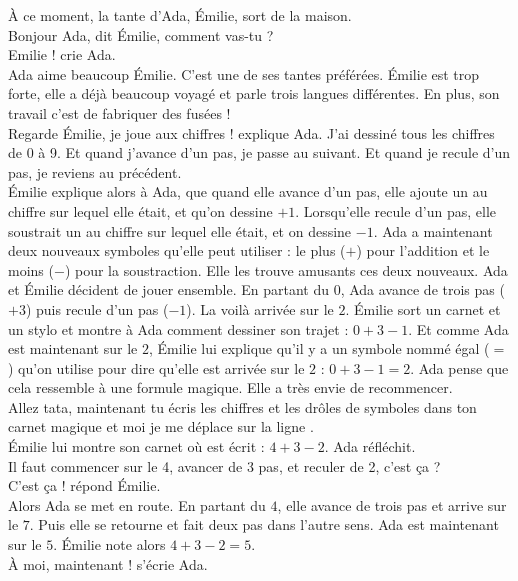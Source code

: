 À ce moment, la tante d'Ada, Émilie, sort de la maison. \\
\guillemotleft Bonjour Ada, dit Émilie, comment vas-tu ?\\
\mdash Emilie !  crie Ada. \guillemotright \\
Ada aime beaucoup Émilie. C’est une de ses tantes préférées. Émilie est trop forte, elle a déjà beaucoup voyagé et parle trois langues différentes. En plus, son travail c’est de fabriquer des fusées !\\
\guillemotleft Regarde Émilie, je joue aux chiffres ! explique Ada. J’ai dessiné tous les chiffres de 0 à 9. Et quand j’avance d’un pas, je passe au suivant. Et quand je recule d’un pas, je reviens au précédent. \guillemotright \\
Émilie explique alors à Ada, que quand elle avance d’un pas, elle ajoute un au chiffre sur lequel elle était, et qu'on dessine $+1$. Lorsqu’elle recule d’un pas, elle soustrait un au chiffre sur lequel elle était, et on dessine $-1$. Ada a maintenant deux nouveaux symboles qu’elle peut utiliser : le plus ($+$) pour l’addition et le moins ($-$) pour la soustraction. Elle les trouve amusants ces deux nouveaux. 
Ada et Émilie décident de jouer ensemble. En partant du $0$, Ada avance de trois pas ($+3$) puis recule d'un pas ($-1$). La voilà arrivée sur le $2$. Émilie sort un carnet et un stylo et montre à Ada comment dessiner son trajet : $0 + 3 - 1 $. Et comme Ada est maintenant sur le $2$, Émilie lui explique qu’il y a un symbole nommé égal ($=$) qu'on utilise pour dire qu’elle est arrivée sur le $2$ : $0 + 3 - 1 = 2$. Ada pense que cela ressemble à une formule magique. Elle a très envie de recommencer. \\
\guillemotleft Allez tata, maintenant tu écris les chiffres et les drôles de symboles dans ton carnet magique et moi je me déplace sur la ligne \guillemotright. \\
Émilie lui montre son carnet où est écrit : $4 + 3 - 2$. Ada réfléchit. \\
\guillemotleft Il faut commencer sur le 4, avancer de 3 pas, et reculer de 2, c’est ça ? \\
\mdash C’est ça ! répond Émilie. \guillemotright \\
Alors Ada se met en route. En partant du $4$, elle avance de trois pas et arrive sur le $7$. Puis elle se retourne et fait deux pas dans l’autre sens. Ada est maintenant sur le $5$. Émilie note alors $4 + 3 - 2 = 5 $.\\
\guillemotleft À moi, maintenant ! s’écrie Ada. \guillemotright \\
